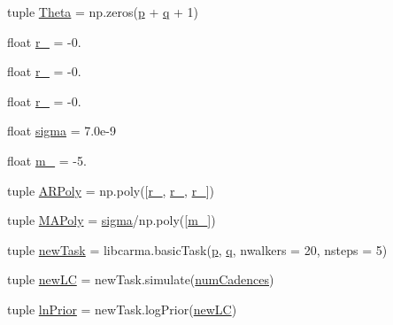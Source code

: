 \begin{DoxyCompactItemize}
\item 
tuple \hyperlink{namespace_c_a_r_m_a_demo_a5110720bf5a6c1cf9a737c7ffac9774e}{Theta} = np.\-zeros(\hyperlink{namespace_c_a_r_m_a_demo_adf3b3082a9cb9203add8b494f5932ba8}{p} + \hyperlink{namespace_c_a_r_m_a_demo_a71450e798960cbdb932b7f4721305832}{q} + 1)
\item 
float \hyperlink{namespace_c_a_r_m_a_demo_aa32ceb76d602a0d157916cf91ad6377c}{r\-\_} = -\/0.
\item 
float \hyperlink{namespace_c_a_r_m_a_demo_aac6267bad07ea88a21753363b78d8153}{r\-\_} = -\/0.
\item 
float \hyperlink{namespace_c_a_r_m_a_demo_a514fd8674af7ed60c5c647977b726159}{r\-\_} = -\/0.
\item 
float \hyperlink{namespace_c_a_r_m_a_demo_a9784ff8e7b9633d4c1cf8d882bf51c9d}{sigma} = 7.\-0e-\/9
\item 
float \hyperlink{namespace_c_a_r_m_a_demo_abc098662555c536fb138b929ca6217fe}{m\-\_} = -\/5.
\item 
tuple \hyperlink{namespace_c_a_r_m_a_demo_a0bd7421159653b05873148bf10b1e507}{A\-R\-Poly} = np.\-poly(\mbox{[}\hyperlink{namespace_c_a_r_m_a_demo_aa32ceb76d602a0d157916cf91ad6377c}{r\-\_}, \hyperlink{namespace_c_a_r_m_a_demo_aac6267bad07ea88a21753363b78d8153}{r\-\_}, \hyperlink{namespace_c_a_r_m_a_demo_a514fd8674af7ed60c5c647977b726159}{r\-\_}\mbox{]})
\item 
tuple \hyperlink{namespace_c_a_r_m_a_demo_a75c9618722e8c9ed0413797b6ec304eb}{M\-A\-Poly} = \hyperlink{namespace_c_a_r_m_a_demo_a9784ff8e7b9633d4c1cf8d882bf51c9d}{sigma}/np.\-poly(\mbox{[}\hyperlink{namespace_c_a_r_m_a_demo_abc098662555c536fb138b929ca6217fe}{m\-\_}\mbox{]})
\item 
tuple \hyperlink{namespace_c_a_r_m_a_demo_a8303626832dad7b21c7f02d3bcd0f092}{new\-Task} = libcarma.\-basic\-Task(\hyperlink{namespace_c_a_r_m_a_demo_adf3b3082a9cb9203add8b494f5932ba8}{p}, \hyperlink{namespace_c_a_r_m_a_demo_a71450e798960cbdb932b7f4721305832}{q}, nwalkers = 20, nsteps = 5)
\item 
tuple \hyperlink{namespace_c_a_r_m_a_demo_a00f90358447346616f81cdf0ba8454e2}{new\-L\-C} = new\-Task.\-simulate(\hyperlink{namespace_c_a_r_m_a_demo_a0bf150d4bd0d4b119fbe66ea9a3f5ebc}{num\-Cadences})
\item 
tuple \hyperlink{namespace_c_a_r_m_a_demo_a4f81958bf384b1670f402eea57d64ebb}{ln\-Prior} = new\-Task.\-log\-Prior(\hyperlink{namespace_c_a_r_m_a_demo_a00f90358447346616f81cdf0ba8454e2}{new\-L\-C})

\end{DoxyCompactItemize}
